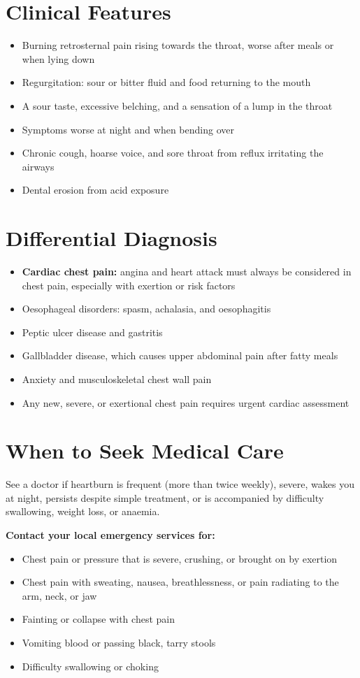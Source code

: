 \section*{Clinical Features}
\begin{itemize}
    \item Burning retrosternal pain rising towards the throat, worse after meals or when lying down
    \item Regurgitation: sour or bitter fluid and food returning to the mouth
    \item A sour taste, excessive belching, and a sensation of a lump in the throat
    \item Symptoms worse at night and when bending over
    \item Chronic cough, hoarse voice, and sore throat from reflux irritating the airways
    \item Dental erosion from acid exposure
\end{itemize}

\section*{Differential Diagnosis}
\begin{itemize}
    \item \textbf{Cardiac chest pain:} angina and heart attack must always be considered in chest pain, especially with exertion or risk factors
    \item Oesophageal disorders: spasm, achalasia, and oesophagitis
    \item Peptic ulcer disease and gastritis
    \item Gallbladder disease, which causes upper abdominal pain after fatty meals
    \item Anxiety and musculoskeletal chest wall pain
    \item Any new, severe, or exertional chest pain requires urgent cardiac assessment
\end{itemize}

\section*{When to Seek Medical Care}
See a doctor if heartburn is frequent (more than twice weekly), severe, wakes you at night, persists despite simple treatment, or is accompanied by difficulty swallowing, weight loss, or anaemia.

\textbf{Contact your local emergency services for:}
\begin{itemize}
    \item Chest pain or pressure that is severe, crushing, or brought on by exertion
    \item Chest pain with sweating, nausea, breathlessness, or pain radiating to the arm, neck, or jaw
    \item Fainting or collapse with chest pain
    \item Vomiting blood or passing black, tarry stools
    \item Difficulty swallowing or choking
\end{itemize}

